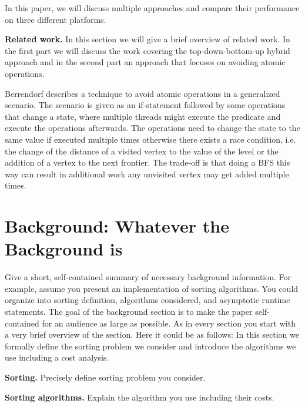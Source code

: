 \documentclass[letterpaper]{article}
\newcommand{\mypar}[1]{{\bf #1.}}
\begin{document}
In this paper, we will discuss multiple approaches and compare their performance on three different platforms.

\mypar{Related work} 
In this section we will give a brief overview of related work. In the first part we will discuss the work covering the top-down-bottom-up hybrid approach and in the second part an approach that focuses on avoiding atomic operations.

\cite{6691600}
\cite{beamer2011searching}

Berrendorf \cite{Berrendorf:14} describes a technique to avoid atomic operations in a generalized scenario. The scenario is given as an if-statement followed by some operations that change a state, where multiple threads might execute the predicate and execute the operations afterwards. The operations need to change the state to the same value if executed multiple times otherwise there exists a race condition, i.e. the change of the distance of a visited vertex to the value of the level or the addition of a vertex to the next frontier. The trade-off is that doing a BFS this way can result in additional work any unvisited vertex may get added multiple times.



\section{Background: Whatever the Background is}\label{sec:background}

Give a short, self-contained summary of necessary
background information. For example, assume you present an
implementation of sorting algorithms. You could organize into sorting
definition, algorithms considered, and asymptotic runtime statements. The goal of the
background section is to make the paper self-contained for an audience
as large as possible. As in every section
you start with a very brief overview of the section. Here it could be as follows: In this section 
we formally define the sorting problem we consider and introduce the algorithms we use
including a cost analysis.

\mypar{Sorting}
Precisely define sorting problem you consider.

\mypar{Sorting algorithms}
Explain the algorithm you use including their costs.
\end{document}
